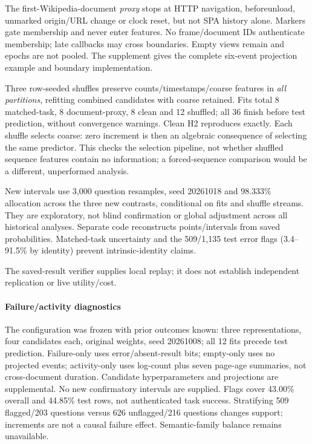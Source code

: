 

The first-Wikipedia-document \emph{proxy} stops at HTTP navigation, beforeunload, unmarked origin/URL change or clock reset, but not SPA history alone. Markers gate membership and never enter features. No frame/document IDs authenticate membership; late callbacks may cross boundaries. Empty views remain and epochs are not pooled. The supplement gives the complete six-event projection example and boundary implementation.

Three row-seeded shuffles preserve counts/timestamps/coarse features in \emph{all partitions}, refitting combined candidates with coarse retained. Fits total 8 matched-task, 8 document-proxy, 8 clean and 12 shuffled; all 36 finish before test prediction, without convergence warnings. Clean H2 reproduces exactly. Each shuffle selects coarse: zero increment is then an algebraic consequence of selecting the same predictor. This checks the selection pipeline, not whether shuffled sequence features contain no information; a forced-sequence comparison would be a different, unperformed analysis.



New intervals use 3,000 question resamples, seed 20261018 and 98.333\% allocation across the three new contrasts, conditional on fits and shuffle streams. They are exploratory, not blind confirmation or global adjustment across all historical analyses. Separate code reconstructs points/intervals from saved probabilities. Matched-task uncertainty and the 509/1,135 test error flags (3.4--91.5\% by identity) prevent intrinsic-identity claims.

The saved-result verifier supplies local replay; it does not establish independent replication or live utility/cost.

\paragraph{Failure/activity diagnostics}
The configuration was frozen with prior outcomes known: three representations, four candidates each, original weights, seed 20261008; all 12 fits precede test prediction. Failure-only uses error/absent-result bits; empty-only uses no projected events; activity-only uses log-count plus seven page-age summaries, not cross-document duration. Candidate hyperparameters and projections are supplemental. No new confirmatory intervals are supplied. Flags cover 43.00\% overall and 44.85\% test rows, not authenticated task success. Stratifying 509 flagged/203 questions versus 626 unflagged/216 questions changes support; increments are not a causal failure effect. Semantic-family balance remains unavailable.

